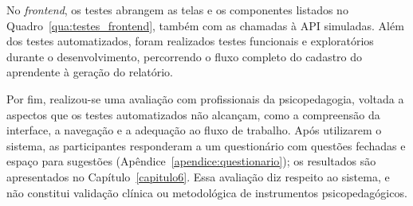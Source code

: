 No \textit{frontend}, os testes abrangem as telas e os componentes listados no Quadro~\ref{qua:testes_frontend}, também com as chamadas à API simuladas. Além dos testes automatizados, foram realizados testes funcionais e exploratórios durante o desenvolvimento, percorrendo o fluxo completo do cadastro do aprendente à geração do relatório.

Por fim, realizou-se uma avaliação com profissionais da psicopedagogia, voltada a aspectos que os testes automatizados não alcançam, como a compreensão da interface, a navegação e a adequação ao fluxo de trabalho. Após utilizarem o sistema, as participantes responderam a um questionário com questões fechadas e espaço para sugestões (Apêndice~\ref{apendice:questionario}); os resultados são apresentados no Capítulo~\ref{capitulo6}. Essa avaliação diz respeito ao sistema, e não constitui validação clínica ou metodológica de instrumentos psicopedagógicos.